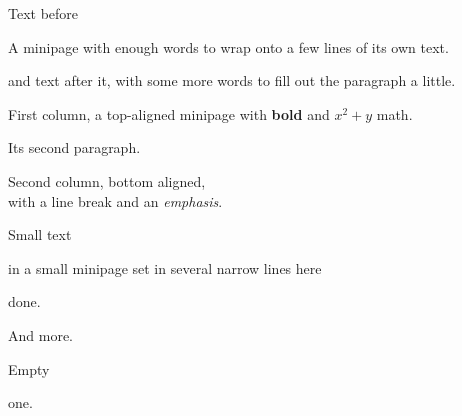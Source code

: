 \documentclass{article}
\begin{document}
Text before
\begin{minipage}{4cm}
A minipage with enough words to wrap onto a few lines of its own text.
\end{minipage}
and text after it, with some more words to fill out the paragraph a little.

\begin{minipage}[t]{0.45\textwidth}
First column, a top-aligned minipage with \textbf{bold} and $x^2+y$ math.

Its second paragraph.
\end{minipage}\hfill
\begin{minipage}[b]{0.45\textwidth}
Second column, bottom aligned,\\ with a line break and an \emph{emphasis}.
\end{minipage}

{\small Small text
\begin{minipage}[c]{3cm}
in a small minipage set in several narrow lines here
\end{minipage}
done.} And more.

Empty \begin{minipage}{2cm}\end{minipage} one.
\end{document}
